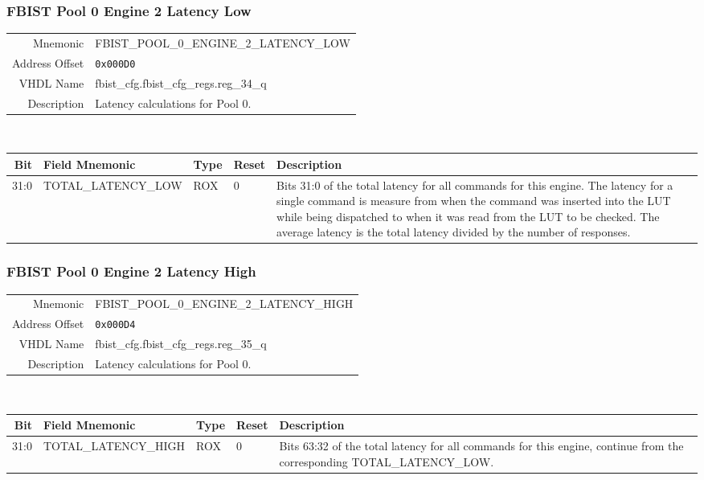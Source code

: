 \subsubsection{FBIST Pool 0 Engine 2 Latency Low}
\begin{tabular}{ r | p{350px} }
  Mnemonic       & FBIST\_POOL\_0\_ENGINE\_2\_LATENCY\_LOW \\
  Address Offset & \texttt{0x000D0}                        \\
  VHDL Name      &  fbist\_cfg.fbist\_cfg\_regs.reg\_34\_q \\ \hline

  Description &
  Latency calculations for Pool 0. \\
\end{tabular}
\\
\begin{tabularx}{\textwidth}{r|l|l|l|X}
  \hline
  Bit   & Field Mnemonic      & Type & Reset & Description \\ \hline

  31:0  & TOTAL\_LATENCY\_LOW & ROX  & 0     &

  Bits 31:0 of the total latency for all commands for this engine. The
  latency for a single command is measure from when the command was
  inserted into the LUT while being dispatched to when it was read
  from the LUT to be checked. The average latency is the total latency
  divided by the number of responses. \\
\end{tabularx}

\subsubsection{FBIST Pool 0 Engine 2 Latency High}
\begin{tabular}{ r | p{350px} }
  Mnemonic       & FBIST\_POOL\_0\_ENGINE\_2\_LATENCY\_HIGH \\
  Address Offset & \texttt{0x000D4}                         \\
  VHDL Name      &  fbist\_cfg.fbist\_cfg\_regs.reg\_35\_q  \\ \hline

  Description &
  Latency calculations for Pool 0. \\
\end{tabular}
\\
\begin{tabularx}{\textwidth}{r|l|l|l|X}
  \hline
  Bit   & Field Mnemonic       & Type & Reset & Description \\ \hline

  31:0  & TOTAL\_LATENCY\_HIGH & ROX  & 0     &

  Bits 63:32 of the total latency for all commands for this engine,
  continue from the corresponding TOTAL\_LATENCY\_LOW. \\
\end{tabularx}

